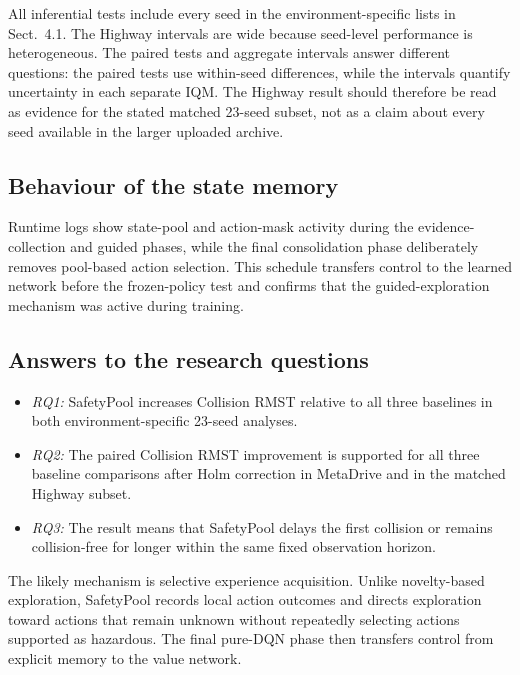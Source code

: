 \documentclass[runningheads]{llncs}
\begin{document}
All inferential tests include every seed in the environment-specific lists in Sect.~4.1. The Highway intervals are wide because seed-level performance is heterogeneous. The paired tests and aggregate intervals answer different questions: the paired tests use within-seed differences, while the intervals quantify uncertainty in each separate IQM. The Highway result should therefore be read as evidence for the stated matched 23-seed subset, not as a claim about every seed available in the larger uploaded archive.

\subsection{Behaviour of the state memory}

Runtime logs show state-pool and action-mask activity during the evidence-collection and guided phases, while the final consolidation phase deliberately removes pool-based action selection. This schedule transfers control to the learned network before the frozen-policy test and confirms that the guided-exploration mechanism was active during training.

\subsection{Answers to the research questions}

\begin{itemize}[leftmargin=1.8em,labelindent=0pt,labelsep=0.5em,itemsep=0.25em,topsep=0.25em]
\item \textit{RQ1:} SafetyPool increases Collision RMST relative to all three baselines in both environment-specific 23-seed analyses.
\item \textit{RQ2:} The paired Collision RMST improvement is supported for all three baseline comparisons after Holm correction in MetaDrive and in the matched Highway subset.
\item \textit{RQ3:} The result means that SafetyPool delays the first collision or remains collision-free for longer within the same fixed observation horizon.
\end{itemize}

The likely mechanism is selective experience acquisition. Unlike novelty-based exploration, SafetyPool records local action outcomes and directs exploration toward actions that remain unknown without repeatedly selecting actions supported as hazardous. The final pure-DQN phase then transfers control from explicit memory to the value network.
\end{document}
